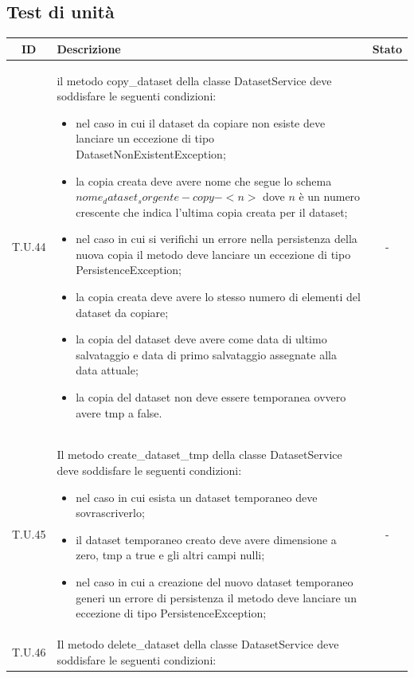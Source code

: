 \subsection{Test di unità}
\label{subsec:test_unita}
\begin{tabularx}{\textwidth}{|c|X|c|}
    \hline
    \textbf{ID} & \textbf{Descrizione} & \textbf{Stato} \\
    \hline
    \label{tu:tu44} T.U.44 & il metodo copy\_dataset della classe DatasetService deve soddisfare le seguenti condizioni:
    \begin{itemize}
        \item nel caso in cui il dataset da copiare non esiste deve lanciare un eccezione di tipo DatasetNonExistentException;
        \item la copia creata deve avere nome che segue lo schema $nome_dataset_sorgente-copy-<n>$ dove $n$ è un numero crescente che indica l'ultima copia creata per il dataset;
        \item nel caso in cui si verifichi un errore nella persistenza della nuova copia il metodo deve lanciare un eccezione di tipo PersistenceException;
        \item la copia creata deve avere lo stesso numero di elementi del dataset da copiare;
        \item la copia del dataset deve avere come data di ultimo salvataggio e data di primo salvataggio assegnate alla data attuale;
        \item la copia del dataset non deve essere temporanea ovvero avere tmp a false.
    \end{itemize} & - \\
    \hline 
    \label{tu:tu45} T.U.45 &  Il metodo create\_dataset\_tmp della classe DatasetService deve soddisfare le seguenti condizioni:
    \begin{itemize}
        \item nel caso in cui esista un dataset temporaneo deve sovrascriverlo;
        \item il dataset temporaneo creato deve avere dimensione a zero, tmp a true e gli altri campi nulli;
        \item nel caso in cui a creazione del nuovo dataset temporaneo generi un errore di persistenza il metodo deve lanciare un eccezione di tipo PersistenceException;
    \end{itemize} & - \\
    \hline 
    \label{tu:tu46} T.U.46 & Il metodo delete\_dataset della classe DatasetService deve soddisfare le seguenti condizioni:

\end{tabularx}
